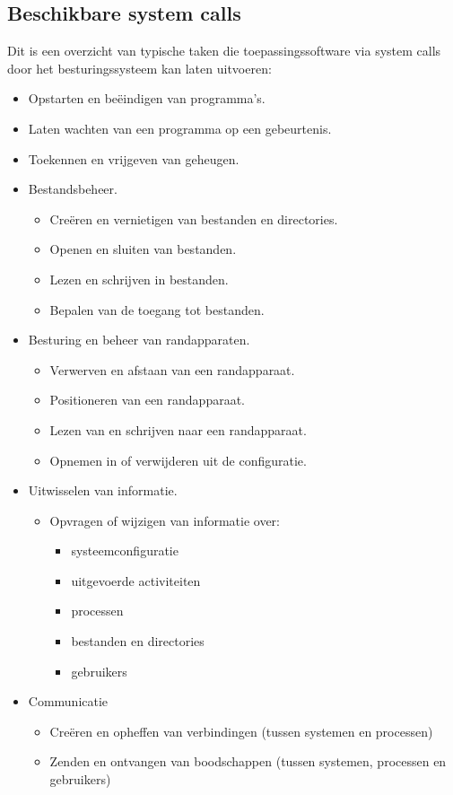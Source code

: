 \subsection{Beschikbare system calls}

Dit is een overzicht van typische taken die toepassingssoftware
via system calls door het besturingssysteem kan laten
uitvoeren:

\begin{itemize}
\item Opstarten en be\"eindigen van programma's.
\item Laten wachten van een programma op een gebeurtenis.
\item Toekennen en vrijgeven van geheugen.
\item Bestandsbeheer.
  \begin{itemize}
  \item Cre\"eren en vernietigen van bestanden en directories.
  \item Openen en sluiten van bestanden.
  \item Lezen en schrijven in bestanden.
  \item Bepalen van de toegang tot bestanden.
  \end{itemize}
\item Besturing en beheer van randapparaten.
  \begin{itemize}
  \item Verwerven en afstaan van een randapparaat.
  \item Positioneren van een randapparaat.
  \item Lezen van en schrijven naar een randapparaat.
  \item Opnemen in of verwijderen uit de configuratie.
  \end{itemize}
\item Uitwisselen van informatie.
  \begin{itemize}
  \item Opvragen of wijzigen van informatie over:
    \begin{itemize}
    \item systeemconfiguratie
    \item uitgevoerde activiteiten
    \item processen
    \item bestanden en directories
    \item gebruikers
    \end{itemize}
  \end{itemize}
\item Communicatie
  \begin{itemize}
  \item Cre\"eren en opheffen van verbindingen (tussen systemen en processen)
  \item Zenden en ontvangen van boodschappen (tussen systemen, processen en
gebruikers)
  \end{itemize}
\end{itemize}

